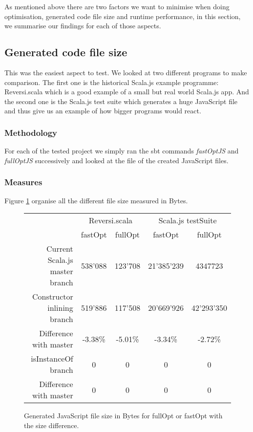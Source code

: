 As mentioned above there are two factors we want to minimise when doing
optimisation, generated code file size and runtime performance, in this
section, we summarise our findings for each of those aspects.

\subsection{Generated code file size}
  This was the easiest aspect to test. We looked at two different programs to
make comparison. The first one is the historical Scala.js example programme:
Reversi.scala which is a good example of a small but real world Scala.js app.
And the second one is the Scala.js test suite which generates a huge JavaScript
file and thus give us an example of how bigger programs would react.

\subsubsection{Methodology}
For each of the tested project we simply ran the sbt commands \emph{fastOptJS}
and \emph{fullOptJS} successively and looked at the file of the created
JavaScript files.

\subsubsection{Measures}
Figure \ref{fig:file_size} organise all the different file size measured in
Bytes.

\begin{figure}[H]
  \centering
  \begin{tabular}{ | r | c | c | c | c | }\hline
    & \multicolumn{2}{|c|}{Reversi.scala} & \multicolumn{2}{|c|}{Scala.js
testSuite}\\
    & fastOpt & fullOpt & fastOpt & fullOpt\\ \hline
    Current Scala.js master branch & 538'088 & 123'708 & 21'385'239 &
4347723\\
\hline \hline
    Constructor inlining branch & 519'886 & 117'508 & 20'669'926 & 42'293'350\\
\hline
    Difference with master & -3.38\% & -5.01\% & -3.34\% & -2.72\%\\ \hline
\hline
    isInstanceOf branch & 0 & 0 & 0 & 0\\ \hline
    Difference with master & 0 & 0 & 0 & 0\\ \hline
  \end{tabular}
  \captionsetup{justification=centering}
  \caption{Generated JavaScript file size in Bytes for fullOpt or fastOpt with
the size difference.}
  \label{fig:file_size}
\end{figure}

